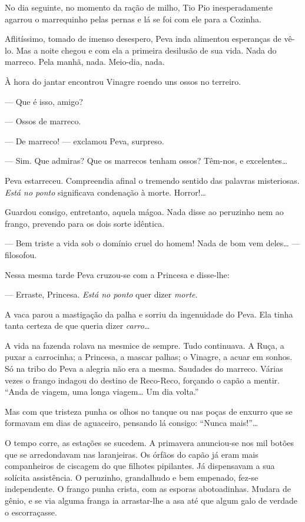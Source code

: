No dia seguinte, no momento da ração de milho, Tio Pio inesperadamente
agarrou o marrequinho pelas pernas e lá se foi com ele para a Cozinha.

Aflitíssimo, tomado de imenso desespero, Peva inda alimentou esperanças
de vê-lo. Mas a noite chegou e com ela a primeira desilusão de sua vida.
Nada do marreco. Pela manhã, nada. Meio-dia, nada.

À hora do jantar encontrou Vinagre roendo uns ossos no terreiro.

--- Que é isso, amigo?

--- Ossos de marreco.

--- De marreco! --- exclamou Peva, surpreso.

--- Sim. Que admiras? Que os marrecos tenham ossos? Têm-nos, e
excelentes\ldots{}

Peva estarreceu. Compreendia afinal o tremendo sentido das palavras
misteriosas. \emph{Está no ponto} significava condenação à morte.
Horror!\ldots{}

Guardou consigo, entretanto, aquela mágoa. Nada disse ao peruzinho nem
ao frango, prevendo para os dois sorte idêntica.

--- Bem triste a vida sob o domínio cruel do homem! Nada de bom vem
deles\ldots{} --- filosofou.

Nessa mesma tarde Peva cruzou-se com a Princesa e disse-lhe:

--- Erraste, Princesa. \emph{Está no ponto} quer dizer \emph{morte}.

A vaca parou a mastigação da palha e sorriu da ingenuidade do Peva. Ela
tinha tanta certeza de que queria dizer \emph{carro}\ldots{}

A vida na fazenda rolava na mesmice de sempre. Tudo continuava. A Ruça,
a puxar a carrocinha; a Princesa, a mascar palhas; o Vinagre, a acuar em
sonhos. Só na tribo do Peva a alegria não era a mesma. Saudades do
marreco. Várias vezes o frango indagou do destino de Reco-Reco, forçando
o capão a mentir. ``Anda de viagem, uma longa viagem\ldots{} Um dia volta.''

Mas com que tristeza punha os olhos no tanque ou nas poças de enxurro
que se formavam em dias de aguaceiro, pensando lá consigo: ``Nunca
mais!''\ldots{}

O tempo corre, as estações se sucedem. A primavera anunciou-se nos mil
botões que se arredondavam nas laranjeiras. Os órfãos do capão já eram
mais companheiros de ciscagem do que filhotes pipilantes. Já dispensavam
a sua solícita assistência. O peruzinho, grandalhudo e bem empenado,
fez-se independente. O frango punha crista, com as esporas abotoadinhas.
Mudara de gênio, e se via alguma franga ia arrastar-lhe a asa até que
algum galo de verdade o escorraçasse.


